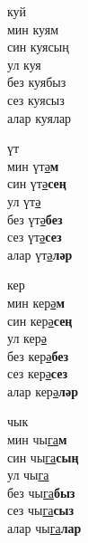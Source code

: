 \begin{multicols}{4}
\begin{enumerate}
\begin{minipage}{\linewidth}
    \item
    куй\\
    мин куям\\
    син куясың\\
    ул куя\\
    без куябыз\\
    сез куясыз\\
    алар куялар\\
\end{minipage}

\begin{minipage}{\linewidth}
    \item
    үт\\
    мин үт\underline{ә}\textbf{м}\\
    син үт\underline{ә}\textbf{сең}\\
    ул үт\underline{ә}\\
    без үт\underline{ә}\textbf{без}\\
    сез үт\underline{ә}\textbf{сез}\\
    алар үт\underline{ә}\textbf{ләр}\\
\end{minipage}

\begin{minipage}{\linewidth}
    \item
    кер\\
    мин кер\underline{ә}\textbf{м}\\
    син кер\underline{ә}\textbf{сең}\\
    ул кер\underline{ә}\\
    без кер\underline{ә}\textbf{без}\\
    сез кер\underline{ә}\textbf{сез}\\
    алар кер\underline{ә}\textbf{ләр}\\
\end{minipage}

\begin{minipage}{\linewidth}
    \item
    чык\\
    мин чы\underline{га}\textbf{м}\\
    син чы\underline{га}\textbf{сың}\\
    ул чы\underline{га}\\
    без чы\underline{га}\textbf{быз}\\
    сез чы\underline{га}\textbf{сыз}\\
    алар чы\underline{га}\textbf{лар}\\
\end{minipage}


\end{enumerate}
\end{multicols}

